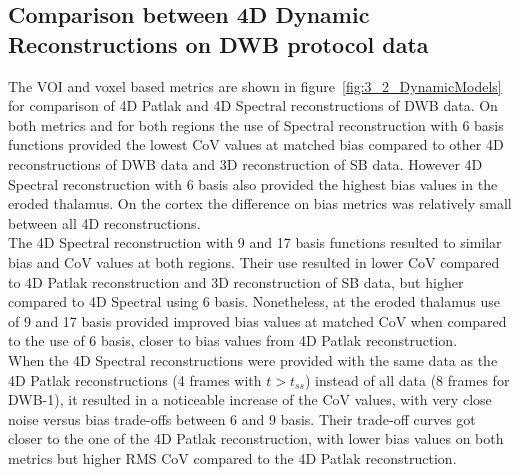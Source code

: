 \subsection*{Comparison between 4D Dynamic Reconstructions on DWB protocol data}
The VOI and voxel based metrics are shown in figure~\ref{fig:3_2_DynamicModels} for comparison of 4D Patlak and 4D Spectral reconstructions of DWB data.
On both metrics and for both regions the use of Spectral reconstruction with 6 basis functions provided the lowest CoV values at matched bias compared to other 4D reconstructions of DWB data and 3D reconstruction of SB data. However 4D Spectral reconstruction with 6 basis also provided the highest bias values in the eroded thalamus. On the cortex the difference on bias metrics was relatively small between all 4D reconstructions.\\
The 4D Spectral reconstruction with 9 and 17 basis functions resulted to similar bias and CoV values at both regions. Their use resulted in lower CoV compared to 4D Patlak reconstruction and 3D reconstruction of SB data, but higher compared to 4D Spectral using 6 basis. Nonetheless, at the eroded thalamus use of 9 and 17 basis provided improved bias values at matched CoV when compared to the use of 6 basis, closer to bias values from 4D Patlak reconstruction.\\
When the 4D Spectral reconstructions were provided with the same data as the 4D Patlak reconstructions (4 frames with $t>t_{ss}$) instead of all data (8 frames for DWB-1), it resulted in a noticeable increase of the CoV values, with very close noise versus bias trade-offs between 6 and 9 basis. Their trade-off curves got closer to the one of the 4D Patlak reconstruction, with lower bias values on both metrics but higher RMS CoV compared to the 4D Patlak reconstruction.


